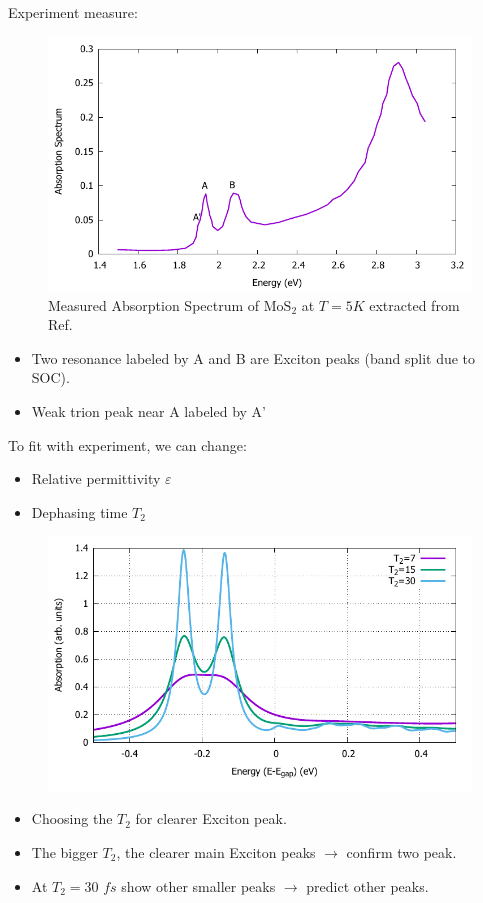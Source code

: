 \documentclass{beamer}
\begin{document}
	\begin{frame}
		Experiment measure:
		\begin{multicols}{2}
		\begin{figure}
	\includegraphics[width = 1\linewidth]{images/Experiment.pdf}
	\caption{Measured Absorption Spectrum of $\mathrm{MoS}_2$ at $T=5K$  extracted from Ref.  \autocite{zhang_absorption_2014}}
	\end{figure}
	\columnbreak
	\begin{itemize}
		\item Two resonance labeled by A and B are Exciton peaks (band split due to SOC).
		\item Weak trion peak near A labeled by A'
	\end{itemize}
To fit with experiment, we can change:
\begin{itemize}
\item Relative permittivity $\varepsilon$
\item Dephasing time $T_2$
\end{itemize}
	\end{multicols}
	\end{frame}
\begin{frame}
\begin{figure}
	\includegraphics[width=0.8\linewidth]{images/varyT2.pdf}
\end{figure}
		
\begin{itemize}
\item Choosing the $T_2$ for clearer Exciton peak.
\item The bigger $T_2$, the clearer main Exciton peaks $\to $ confirm two peak.
\item At $T_2 = 30$ \(fs\) show other smaller peaks $\to $ predict other peaks.
\end{itemize}
\end{frame}
\end{document}
